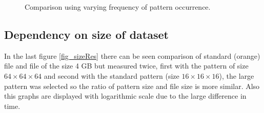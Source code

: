 \begin{figure}
\begin{minipage}{.5\linewidth}
\centering
{}
\end{minipage}%
\begin{minipage}{.5\linewidth}
\centering
{}
\end{minipage}\par\medskip

\caption{Comparison using varying frequency of pattern occurrence.}
\label{fig_patRes}
\end{figure}

\subsection{Dependency on size of dataset}
In the last figure \ref{fig_sizeRes} there can be seen comparison of standard (orange) file and file of the size 4 GB but measured twice, first with the pattern of size $64\times64\times64$ and second with the standard pattern (size $16\times16\times16$), the large pattern was selected so the ratio of pattern size and file size is more similar. Also this graphs are displayed with logarithmic scale due to the large difference in time. 

